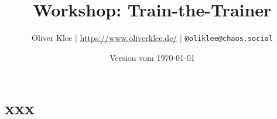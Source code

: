 \documentclass[a4paper,openany,twoside,titlepage,10pt,headsepline]{scrbook}
\author{Oliver Klee | \url{https://www.oliverklee.de/} | \texttt{@oliklee@chaos.social}}
\title{Workshop: Train-the-Trainer}
\date{Version vom \today}
\begin{document}
\frontmatter

\maketitle

\tableofcontents

\mainmatter

\chapter{xxx}






\backmatter
\end{document}

